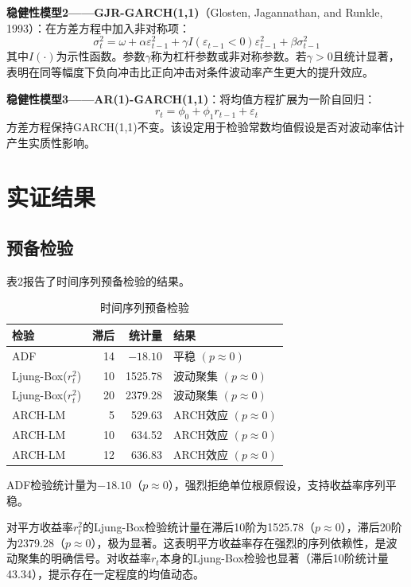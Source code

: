 \documentclass[11pt,a4paper]{article}
\begin{document}
\textbf{稳健性模型2——GJR-GARCH(1,1)}（Glosten, Jagannathan, and Runkle, 1993）：在方差方程中加入非对称项：
\[
\sigma_t^2 = \omega + \alpha \varepsilon_{t-1}^2 + \gamma I(\varepsilon_{t-1} < 0) \varepsilon_{t-1}^2 + \beta \sigma_{t-1}^2
\]
其中\(I(\cdot)\)为示性函数。参数\(\gamma\)称为杠杆参数或非对称参数。若\(\gamma > 0\)且统计显著，表明在同等幅度下负向冲击比正向冲击对条件波动率产生更大的提升效应。

\textbf{稳健性模型3——AR(1)-GARCH(1,1)}：将均值方程扩展为一阶自回归：
\[
r_t = \phi_0 + \phi_1 r_{t-1} + \varepsilon_t
\]
方差方程保持GARCH(1,1)不变。该设定用于检验常数均值假设是否对波动率估计产生实质性影响。

\section{实证结果}

\subsection{预备检验}

表2报告了时间序列预备检验的结果。

\begin{table}[ht]
\centering
\caption{时间序列预备检验}
\begin{tabular}{lrrl}
\toprule
检验 & 滞后 & 统计量 & 结果 \\
\midrule
ADF & 14 & $-18.10$ & 平稳 \((p\approx 0)\) \\
Ljung-Box(\(r_t^2\)) & 10 & 1525.78 & 波动聚集 \((p\approx 0)\) \\
Ljung-Box(\(r_t^2\)) & 20 & 2379.28 & 波动聚集 \((p\approx 0)\) \\
ARCH-LM & 5 & 529.63 & ARCH效应 \((p\approx 0)\) \\
ARCH-LM & 10 & 634.52 & ARCH效应 \((p\approx 0)\) \\
ARCH-LM & 12 & 636.83 & ARCH效应 \((p\approx 0)\) \\
\bottomrule
\end{tabular}
\end{table}

ADF检验统计量为$-18.10$（\(p\approx 0\)），强烈拒绝单位根原假设，支持收益率序列平稳。

对平方收益率\(r_t^2\)的Ljung-Box检验统计量在滞后10阶为1525.78（\(p\approx 0\)），滞后20阶为2379.28（\(p\approx 0\)），极为显著。这表明平方收益率存在强烈的序列依赖性，是波动聚集的明确信号。对收益率\(r_t\)本身的Ljung-Box检验也显著（滞后10阶统计量43.34），提示存在一定程度的均值动态。
\end{document}
